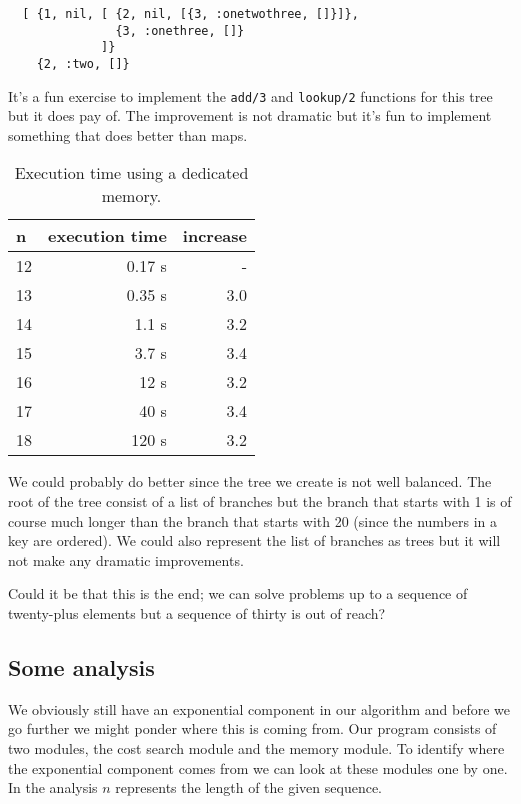 \documentclass[a4paper,11pt]{article}
\begin{document}
\begin{verbatim}
  [ {1, nil, [ {2, nil, [{3, :onetwothree, []}]},
               {3, :onethree, []}
             ]}
    {2, :two, []}
\end{verbatim}

It's a fun exercise to implement the {\tt add/3} and {\tt lookup/2}
functions for this tree but it does pay of. The improvement is not
dramatic but it's fun to implement something that does better than
maps.

\begin{table}[h!]
  \begin{center}
    \begin{tabular}{l|r|r}
      \textbf{n} & \textbf{execution time} & \textbf{increase}\\
      \hline
      12	 &0.17 s & -\\ 
      13	 &0.35 s &3.0 \\ 
      14	 &1.1 s &3.2 \\ 
      15	 &3.7 s &3.4 \\ 
      16	 &12 s &3.2 \\ 
      17	 &40 s &3.4 \\ 
      18	 &120 s&3.2 \\ 
    \end{tabular}
    \caption{Execution time using a dedicated memory.}
  \end{center}
\end{table}

We could probably do better since the tree we create is not well
balanced. The root of the tree consist of a list of branches but the
branch that starts with 1 is of course much longer than the branch
that starts with 20 (since the numbers in a key are ordered). We could
also represent the list of branches as trees  but it will not
make any dramatic improvements.

Could it be that this is the end; we can solve problems up to a
sequence of twenty-plus elements but a sequence of thirty is out of
reach? 

\subsection*{Some analysis}

We obviously still have an exponential component in our algorithm and
before we go further we might ponder where this is coming from. Our
program consists of two modules, the cost search module and the memory
module. To identify where the exponential component comes from we can
look at these modules one by one. In the analysis $n$ represents the
length of the given sequence. 
\end{document}
